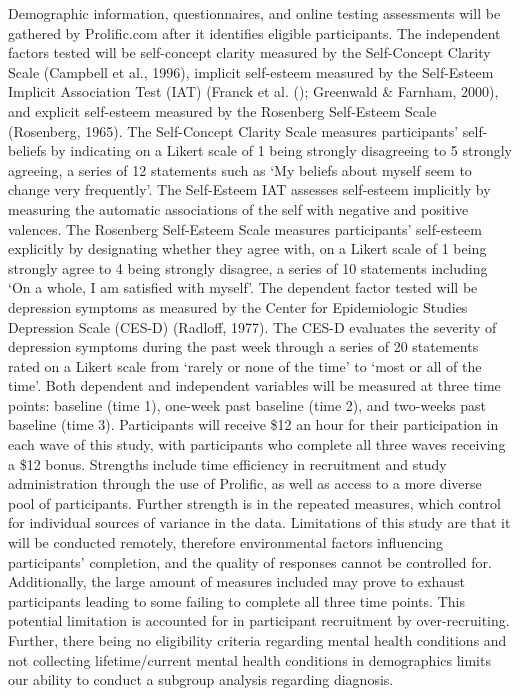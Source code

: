 \documentclass[
  man,
  floatsintext,
  longtable,
  nolmodern,
  notxfonts,
  notimes,
  colorlinks=true,linkcolor=blue,citecolor=blue,urlcolor=blue]{apa7}
\begin{document}
Demographic information, questionnaires, and online testing assessments
will be gathered by Prolific.com after it identifies eligible
participants. The independent factors tested will be self-concept
clarity measured by the Self-Concept Clarity Scale (Campbell et al.,
1996), implicit self-esteem measured by the Self-Esteem Implicit
Association Test (IAT) (Franck et al.
(); Greenwald \& Farnham,
2000), and explicit self-esteem measured by the Rosenberg Self-Esteem
Scale (Rosenberg, 1965). The Self-Concept Clarity Scale measures
participants' self-beliefs by indicating on a Likert scale of 1 being
strongly disagreeing to 5 strongly agreeing, a series of 12 statements
such as `My beliefs about myself seem to change very frequently'. The
Self-Esteem IAT assesses self-esteem implicitly by measuring the
automatic associations of the self with negative and positive valences.
The Rosenberg Self-Esteem Scale measures participants' self-esteem
explicitly by designating whether they agree with, on a Likert scale of
1 being strongly agree to 4 being strongly disagree, a series of 10
statements including `On a whole, I am satisfied with myself'. The
dependent factor tested will be depression symptoms as measured by the
Center for Epidemiologic Studies Depression Scale (CES-D) (Radloff,
1977). The CES-D evaluates the severity of depression symptoms during
the past week through a series of 20 statements rated on a Likert scale
from `rarely or none of the time' to `most or all of the time'. Both
dependent and independent variables will be measured at three time
points: baseline (time 1), one-week past baseline (time 2), and
two-weeks past baseline (time 3). Participants will receive \$12 an hour
for their participation in each wave of this study, with participants
who complete all three waves receiving a \$12 bonus. Strengths include
time efficiency in recruitment and study administration through the use
of Prolific, as well as access to a more diverse pool of participants.
Further strength is in the repeated measures, which control for
individual sources of variance in the data. Limitations of this study
are that it will be conducted remotely, therefore environmental factors
influencing participants' completion, and the quality of responses
cannot be controlled for. Additionally, the large amount of measures
included may prove to exhaust participants leading to some failing to
complete all three time points. This potential limitation is accounted
for in participant recruitment by over-recruiting. Further, there being
no eligibility criteria regarding mental health conditions and not
collecting lifetime/current mental health conditions in demographics
limits our ability to conduct a subgroup analysis regarding diagnosis.
\end{document}
